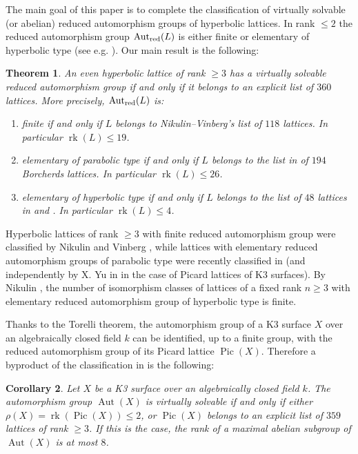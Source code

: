 \documentclass[11pt,letterpaper]{amsart}
\DeclareMathOperator{\rk}{rk}
\DeclareMathOperator{\Aut}{Aut}
\DeclareMathOperator{\Pic}{Pic}
\newcommand{\AutredL}{\Aut_{\rm red}(L)}
\newtheorem{theorem}{Theorem}[section]
\newtheorem{corollary}[theorem]{Corollary}
\theoremstyle{definition}
\theoremstyle{remark}
\begin{document}
The main goal of this paper is to complete the classification of virtually solvable (or abelian) reduced automorphism groups of hyperbolic lattices. In rank $\le 2$ the reduced automorphism group $\AutredL$ is either finite or elementary of hyperbolic type (see e.g. \cite{galluzzi.lombardo.peters}). 
Our main result is the following:
\begin{theorem} \label{thm:main}
An even hyperbolic lattice of rank $\ge 3$ has a virtually solvable reduced automorphism group if and only if it belongs to an explicit list of $360$ lattices. More precisely, $\AutredL$ is:
\begin{enumerate}
    \item finite if and only if $L$ belongs to Nikulin--Vinberg's list of $118$ lattices. In particular $\rk(L)\le 19$.
    \item elementary of parabolic type if and only if $L$ belongs to the list in \cite{brandhorst.mezzedimi} of $194$ Borcherds lattices. In particular $\rk(L)\le 26$.
    \item elementary of hyperbolic type if and only if $L$ belongs to the list of $48$ lattices in  and . In particular $\rk(L)\le 4$.
\end{enumerate}
\end{theorem}
Hyperbolic lattices of rank $\ge 3$ with finite reduced automorphism group were classified by Nikulin \cite{nikulin.finite.aut.greater.5, nikulin.finite.aut.3} and Vinberg \cite{vinberg.finite.aut.4}, while lattices with elementary reduced automorphism groups of parabolic type were recently classified in \cite{brandhorst.mezzedimi} (and independently by X. Yu in \cite{yu.entropy} in the case of Picard lattices of K3 surfaces).
By Nikulin \cite[Theorem 1]{nikulin.interesting}, the number of isomorphism classes of lattices of a fixed rank $n\geq 3$ with elementary reduced automorphism group of hyperbolic type is finite. 


Thanks to the Torelli theorem, the automorphism group of a K3 surface $X$ over an algebraically closed field $k$ can be identified, up to a finite group, with the reduced automorphism group of its Picard lattice $\Pic(X)$. Therefore a byproduct of the classification in  is the following:

\begin{corollary}
Let $X$ be a K3 surface over an algebraically closed field $k$. The automorphism group $\Aut(X)$ is virtually solvable if and only if either $\rho(X)=\rk(\Pic(X))\le 2$, or $\Pic(X)$ belongs to an explicit list of $359$ lattices of rank $\ge 3$. If this is the case, the rank of a maximal abelian subgroup of $\Aut(X)$ is at most $8$.
\end{corollary}
\end{document}
